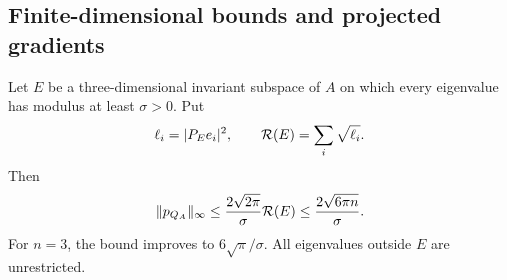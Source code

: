 \subsection{Finite-dimensional bounds and projected gradients}

\begin{theorem}
\label{thm:projected-gradient-slicing}
Let \(E\) be a three-dimensional invariant subspace of \(A\)
on which every eigenvalue has modulus at least \(\sigma>0\).
Put
\[
 \ell_i=|P_Ee_i|^2,\qquad {\cal R}(E)=\sum_i\sqrt{\ell_i}.
\]
Then
\begin{equation}
 \|p_{Q_A}\|_\infty
 \leq\frac{2\sqrt{2\pi}}{\sigma}{\cal R}(E)
 \leq\frac{2\sqrt{6\pi n}}{\sigma}.
 \label{eq:projected-slicing}
\end{equation}
For \(n=3\), the bound improves to \(6\sqrt\pi/\sigma\).
All eigenvalues outside \(E\) are unrestricted.
\end{theorem}
